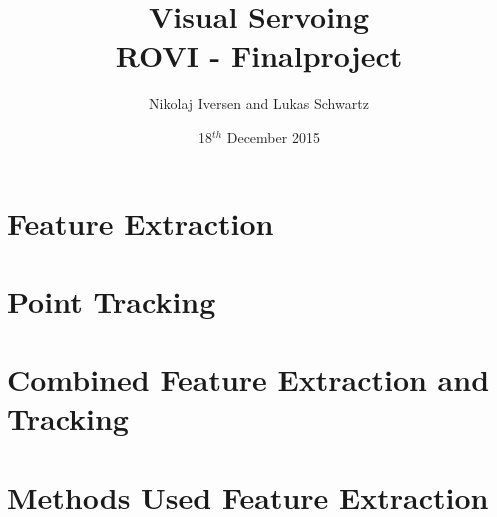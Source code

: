 \documentclass[12pt,a4paper,conference]{IEEEtran}
\begin{document}
\raggedbottom

\title{Visual Servoing\\ \large{ROVI - Finalproject}}
\author{Nikolaj Iversen and Lukas Schwartz}
\date{18$^{th}$ December 2015}

\maketitle


\section{Feature Extraction}




\section{Point Tracking}





\section{Combined Feature Extraction and Tracking}
\label{sec:combinedSystem}




\pagebreak
\appendix


\section{Methods Used Feature Extraction}\label{app:full_vision_part} 



\end{document}

